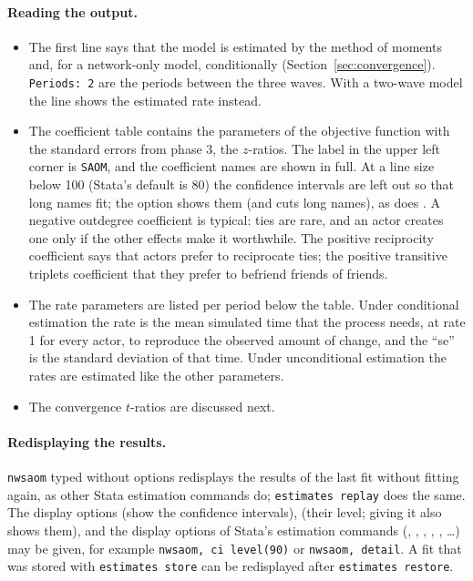 \paragraph{Reading the output.}
\begin{itemize}[nosep]
  \item The first line says that the model is estimated by the method of moments and, for a network-only model, conditionally (Section~\ref{sec:convergence}). \texttt{Periods: 2} are the periods between the three waves. With a two-wave model the line shows the estimated rate instead.
  \item The coefficient table contains the parameters of the objective function with the standard errors from phase 3, the $z$-ratios. The label in the upper left corner is \texttt{SAOM}, and the coefficient names are shown in full. At a line size below 100 (Stata's default is 80) the confidence intervals are left out so that long names fit; the option  shows them (and cuts long names), as does . A negative outdegree coefficient is typical: ties are rare, and an actor creates one only if the other effects make it worthwhile. The positive reciprocity coefficient says that actors prefer to reciprocate ties; the positive transitive triplets coefficient that they prefer to befriend friends of friends.
  \item The rate parameters are listed per period below the table. Under conditional estimation the rate is the mean simulated time that the process needs, at rate 1 for every actor, to reproduce the observed amount of change, and the ``se'' is the standard deviation of that time. Under unconditional estimation the rates are estimated like the other parameters.
  \item The convergence $t$-ratios are discussed next.
\end{itemize}

\paragraph{Redisplaying the results.} \texttt{nwsaom} typed without options redisplays the results of the last fit without fitting again, as other Stata estimation commands do; \texttt{estimates replay} does the same. The display options  (show the confidence intervals),  (their level; giving it also shows them),  and the display options of Stata's estimation commands (, , , , , \ldots) may be given, for example \texttt{nwsaom, ci level(90)} or \texttt{nwsaom, detail}. A fit that was stored with \texttt{estimates store} can be redisplayed after \texttt{estimates restore}.

